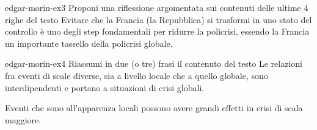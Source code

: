 \documentclass[preview]{standalone}
\begin{document}
\begin{snippetexercise}{edgar-morin-ex3}
{Proponi una riflessione argomentata sui contenuti delle ultime 4 righe del testo}
    Evitare che la Francia (la Repubblica) si trasformi in uno stato del controllo
    è uno degli step fondamentali per ridurre la policrisi,
    essendo la Francia un importante tassello della policrisi globale.
\end{snippetexercise}

\begin{snippetexercise}{edgar-morin-ex4}
{Riassumi in due (o tre) frasi il contenuto del testo}
    Le relazioni fra eventi di scale diverse, sia a livello locale che a quello globale, 
    sono interdipendenti e portano a situazioni di crisi globali.

    Eventi che sono all'apparenza locali possono avere grandi effetti in crisi di scala maggiore.
\end{snippetexercise}
\end{document}
